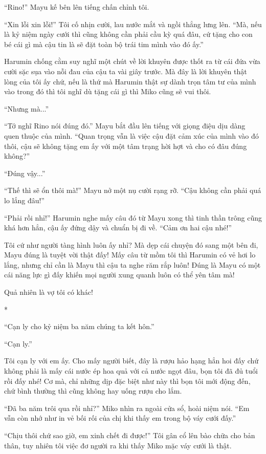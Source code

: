 {``Rino!'' Mayu kế bên lên tiếng chấn chỉnh tôi.

``Xin lỗi xin lỗi!'' Tôi cố nhịn cười, lau nước mắt và ngồi thẳng lưng
lên. ``Mà, nếu là kỷ niệm ngày cưới thì cũng không cần phải cầu kỳ quá
đâu, cứ tặng cho con bé cái gì mà cậu tin là sẽ đặt toàn bộ trái tim
mình vào đó ấy.''

Harumin chống cằm suy nghĩ một chút về lời khuyên được thốt ra từ cái
đứa vừa cười sặc sụa vào nỗi đau của cậu ta vài giây trước. Mà đây là
lời khuyên thật lòng của tôi ấy chứ, nếu là thứ mà Harumin thật sự dành
trọn tâm tư của mình vào trong đó thì tôi nghĩ dù tặng cái gì thì Miko
cũng sẽ vui thôi.

``Nhưng mà...''

``Tớ nghĩ Rino nói đúng đó.'' Mayu bắt đầu lên tiếng với giọng điệu dịu
dàng quen thuộc của mình. ``Quan trọng vẫn là việc cậu đặt cảm xúc của
mình vào đó thôi, cậu sẽ không tặng em ấy với một tâm trạng hời hợt và
cho có đâu đúng không?''

``Đúng vậy...''

``Thế thì sẽ ổn thôi mà!'' Mayu nở một nụ cười rạng rỡ. ``Cậu không cần
phải quá lo lắng đâu!''

``Phải rồi nhỉ!'' Harumin nghe mấy câu đó từ Mayu xong thì tinh thần
trông cũng khá hơn hẳn, cậu ấy đứng dậy và chuẩn bị đi về. ``Cảm ơn hai
cậu nhé!''

Tôi cứ như người tàng hình luôn ấy nhỉ? Mà dẹp cái chuyện đó sang một
bên đi, Mayu đúng là tuyệt vời thật đấy! Mấy câu từ mồm tôi thì Harumin
có vẻ hơi lo lắng, nhưng chỉ cần là Mayu thì cậu ta nghe răm rắp luôn!
Đúng là Mayu có một cái năng lực gì đấy khiến mọi người xung quanh luôn
có thể yên tâm mà!

Quả nhiên là vợ tôi có khác!

*

``Cạn ly cho kỷ niệm ba năm chúng ta kết hôn.''

``Cạn ly.''

Tôi cạn ly với em ấy. Cho mấy người biết, đây là rượu hảo hạng hẳn hoi
đấy chứ không phải là mấy cái nước ép hoa quả với cả nước ngọt đâu, bọn
tôi đã đủ tuổi rồi đấy nhé! Cơ mà, chỉ những dịp đặc biệt như này thì
bọn tôi mới động đến, chứ bình thường thì cũng không hay uống rượu cho
lắm.

``Đã ba năm trôi qua rồi nhỉ?'' Miko nhìn ra ngoài cửa sổ, hoài niệm
nói. ``Em vẫn còn nhớ như in vẻ bối rối của chị khi thấy em trong bộ váy
cưới đấy.''

``Chịu thôi chứ sao giờ, em xinh chết đi được!'' Tôi gân cổ lên bào chữa
cho bản thân, tuy nhiên tôi việc đơ người ra khi thấy Miko mặc váy cưới
là thật.

}
